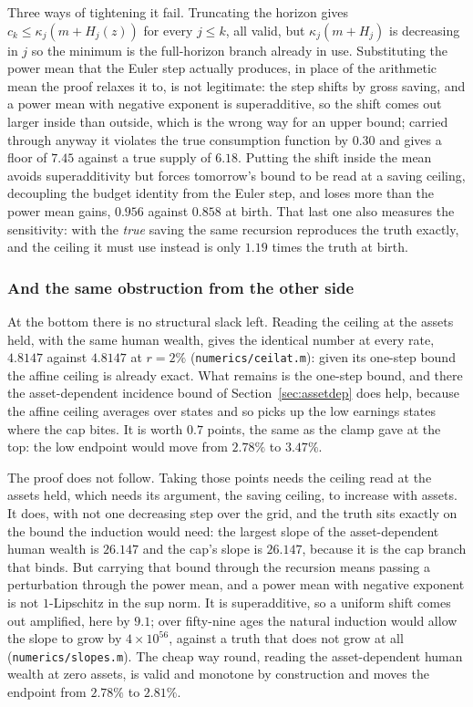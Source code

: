 Three ways of tightening it fail. Truncating the horizon gives $c_k\le\kappa_j(m+H_j(z))$ for
every $j\le k$, all valid, but $\kappa_j(m+H_j)$ is decreasing in $j$ so the minimum is the
full-horizon branch already in use. Substituting the power mean that the Euler step actually
produces, in place of the arithmetic mean the proof relaxes it to, is not legitimate: the step
shifts by gross saving, and a power mean with negative exponent is superadditive, so the shift
comes out larger inside than outside, which is the wrong way for an upper bound; carried through
anyway it violates the true consumption function by $0.30$ and gives a floor of $7.45$ against a
true supply of $6.18$. Putting the shift inside the mean avoids superadditivity but forces
tomorrow's bound to be read at a saving ceiling, decoupling the budget identity from the Euler
step, and loses more than the power mean gains, $0.956$ against $0.858$ at birth. That last one
also measures the sensitivity: with the \emph{true} saving the same recursion reproduces the truth
exactly, and the ceiling it must use instead is only $1.19$ times the truth at birth.

\subsubsection*{And the same obstruction from the other side}\label{sec:botwall}

At the bottom there is no structural slack left. Reading the ceiling at the assets held, with the
same human wealth, gives the identical number at every rate, $4.8147$ against $4.8147$ at
$r=2\%$ (\texttt{numerics/ceilat.m}): given its one-step bound the affine ceiling is already
exact. What remains is the one-step bound, and there the asset-dependent incidence bound of
Section~\ref{sec:assetdep} does help, because the affine ceiling averages over states and so picks
up the low earnings states where the cap bites. It is worth $0.7$ points, the same as the clamp
gave at the top: the low endpoint would move from $2.78\%$ to $3.47\%$.

The proof does not follow. Taking those points needs the ceiling read at the assets held, which
needs its argument, the saving ceiling, to increase with assets. It does, with not one decreasing
step over the grid, and the truth sits exactly on the bound the induction would need: the largest
slope of the asset-dependent human wealth is $26.147$ and the cap's slope is $26.147$, because it
is the cap branch that binds. But carrying that bound through the recursion means passing a
perturbation through the power mean, and a power mean with negative exponent is not $1$-Lipschitz
in the sup norm. It is superadditive, so a uniform shift comes out amplified, here by $9.1$; over
fifty-nine ages the natural induction would allow the slope to grow by $4\times10^{56}$, against a
truth that does not grow at all (\texttt{numerics/slopes.m}). The cheap way round, reading the
asset-dependent human wealth at zero assets, is valid and monotone by construction and moves the
endpoint from $2.78\%$ to $2.81\%$.

